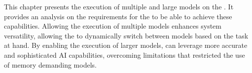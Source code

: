 This chapter presents the execution of multiple and large models on the \graicore{}.
It provides an analysis on the requirements for the \confignoc{} to be able to achieve these capabilities.
Allowing the execution of multiple models enhances system versatility, allowing the \graicore{} to dynamically switch between models based on the task at hand.
By enabling the execution of larger models, \graicore{} can leverage more accurate and sophisticated AI capabilities, overcoming limitations that restricted the use of memory demanding models.
